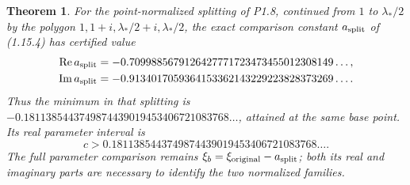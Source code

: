\documentclass[11pt,a4paper]{article}
\newtheorem{theorem}{Theorem}[section]
\theoremstyle{definition}
\begin{document}
\begin{theorem}
For the point-normalized splitting of P1.8, continued from
$1$ to $\lambda_*/2$ by the polygon
$1,1+i,\lambda_*/2+i,\lambda_*/2$, the exact comparison constant
$a_{\rm split}$ of (1.15.4) has certified value
\[
\begin{split}
 \operatorname{Re}a_{\rm split}
   &=-0.7099885679126427771723473455012308149\ldots,\\
 \operatorname{Im}a_{\rm split}
   &=-0.9134017059364153362143229223828373269\ldots.
\end{split}
\]
Thus the minimum in that splitting is
$-0.1811385443749874439019453406721083768\ldots$,
attained at the same base point.  Its real parameter interval is
\[
 c>0.1811385443749874439019453406721083768\ldots.
\]
The full parameter comparison remains
$\xi_b=\xi_{\rm original}-a_{\rm split}$; both its real and imaginary
parts are necessary to identify the two normalized families.
\end{theorem}
\end{document}
